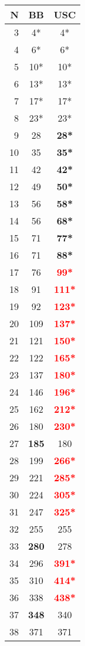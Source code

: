 \begin{tabular}{r|c|c}
 N&BB &USC\\
 \hline
 3&4*&4*\\
 4&6*&6*\\
 5&10*&10*\\
 6&13*&13*\\
 7&17*&17*\\
 8&23*&23*\\
 9&28&\textbf{28*}\\
 10&35&\textbf{35*}\\
 11&42&\textbf{42*}\\
 12&49&\textbf{50*}\\
 13&56&\textbf{58*}\\
 14&56&\textbf{68*}\\
 15&71&\textbf{77*}\\
 16&71&\textbf{88*}\\
 17&76&\textbf{\textcolor{red}{99*}}\\
 18&91&\textbf{\textcolor{red}{111*}}\\
 19&92&\textbf{\textcolor{red}{123*}}\\
 20&109&\textbf{\textcolor{red}{137*}}\\
 21&121&\textbf{\textcolor{red}{150*}}\\
 22&122&\textbf{\textcolor{red}{165*}}\\
 23&137&\textbf{\textcolor{red}{180*}}\\
 24&146&\textbf{\textcolor{red}{196*}}\\
 25&162&\textbf{\textcolor{red}{212*}}\\
 26&180&\textbf{\textcolor{red}{230*}}\\
 27&\textbf{185}&180\\
 28&199&\textbf{\textcolor{red}{266*}}\\
 29&221&\textbf{\textcolor{red}{285*}}\\
 30&224&\textbf{\textcolor{red}{305*}}\\
 31&247&\textbf{\textcolor{red}{325*}}\\
 32&255&255\\
 33&\textbf{280}&278\\
 34&296&\textbf{\textcolor{red}{391*}}\\
 35&310&\textbf{\textcolor{red}{414*}}\\
 36&338&\textbf{\textcolor{red}{438*}}\\
 37&\textbf{348}&340\\
 38&371&371\\\hline
\end{tabular}
 
